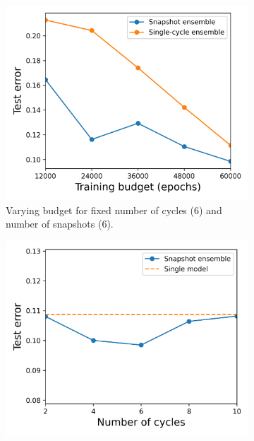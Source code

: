 \begin{figure}[]
	\centering
	\begin{subfigure}{.45\textwidth}
		\centering
		\includegraphics[width=1\linewidth]{./figs/vary_b.png}  
		\caption{Varying budget for fixed number of cycles (6) and number of snapshots (6). \newline}
		\label{fig:sub-first}
	\end{subfigure}
	\begin{subfigure}{.45\textwidth}
		\centering
		\includegraphics[width=1\linewidth]{./figs/vary_ac.png}  

\end{subfigure}
\end{figure}
